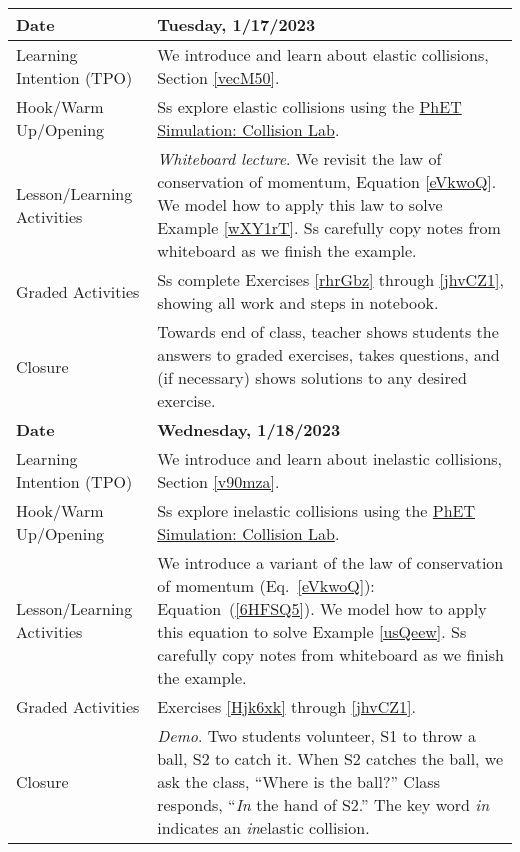 \documentclass[main.tex]{subfiles}
\begin{document}
\begin{tabular}{|m{}|m{}|}
    \hline
    \cellcolor{black!20}\textbf{Date} & \cellcolor{black!20}\textbf{Tuesday, 1/17/2023} \\
    \hline
    Learning Intention (TPO) & We introduce and learn about elastic collisions, Section \ref{vecM50}.\\
    \hline
    Hook/Warm Up/Opening & Ss explore elastic collisions using the \href{https://phet.colorado.edu/en/simulations/collision-lab}{PhET Simulation: Collision Lab}.\\
    \hline
    Lesson/Learning Activities & \textit{Whiteboard lecture}. We revisit the law of conservation of momentum, Equation \ref{eVkwoQ}. We model how to apply this law to solve Example \ref{wXY1rT}. Ss carefully copy notes from whiteboard as we finish the example. \\
    \hline
    Graded Activities & Ss complete Exercises \ref{rhrGbz} through \ref{jhvCZ1}, showing all work and steps in notebook. \\
    \hline
    Closure & Towards end of class, teacher shows students the answers to graded exercises, takes questions, and (if necessary) shows solutions to any desired exercise.\\
    \hline
    \hline

    \cellcolor{black!20}\textbf{Date} & \cellcolor{black!20}\textbf{Wednesday, 1/18/2023} \\
    \hline
    Learning Intention (TPO) & We introduce and learn about inelastic collisions, Section \ref{v90mza}.\\
    \hline
    Hook/Warm Up/Opening & Ss explore inelastic collisions using the \href{https://phet.colorado.edu/en/simulations/collision-lab}{PhET Simulation: Collision Lab}.\\
    \hline
    Lesson/Learning Activities & We introduce a variant of the law of conservation of momentum (Eq.~\ref{eVkwoQ}): Equation~(\ref{6HFSQ5}). We model how to apply this equation to solve Example \ref{usQeew}. Ss carefully copy notes from whiteboard as we finish the example. \\
    \hline
    Graded Activities & Exercises \ref{Hjk6xk} through \ref{jhvCZ1}.\\
    \hline
    Closure & \textit{Demo}. Two students volunteer, S1 to throw a ball, S2 to catch it. When S2 catches the ball, we ask the class, ``Where is the ball?'' Class responds, ``{\color{red}\textit{In}} the hand of S2.'' The key word {\color{red}\textit{in}} indicates an {\color{red}\textit{in}}elastic collision. \\
    \hline
    \hline


\end{tabular}
\end{document}
